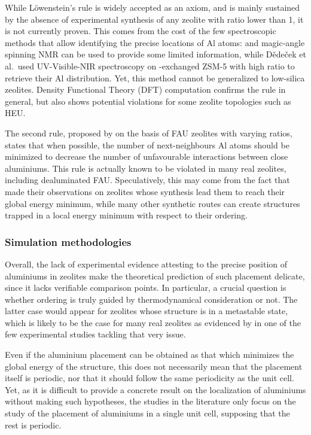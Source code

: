 \documentclass[main.tex]{subfiles}
\begin{document}
While L\"owenstein's rule is widely accepted as an axiom, and is mainly sustained by the absence of experimental synthesis of any zeolite with \SiAl ratio lower than 1, it is not currently proven. This comes from the cost of the few spectroscopic methods that allow identifying the precise locations of Al atoms:  and  magic-angle spinning NMR can be used to provide some limited information\autocite{ZeolitesMagicAngle}, while D{\v{e}}de{\v{c}}ek et al.\,\cite{ZeolitesAlPairs,ZeolitesAlPairs2} used UV-Visible-NIR spectroscopy on -exchanged ZSM-5 with high \SiAl ratio to retrieve their Al distribution. Yet, this method cannot be generalized to low-silica zeolites. Density Functional Theory (DFT) computation confirms the rule in general, but also shows potential violations for some zeolite topologies such as HEU\autocite{HEUnonLowenstein}.

The second rule, proposed by \textcite{Dempsey} on the basis of FAU zeolites with varying \SiAl ratios, states that when possible, the number of next-neighbours Al atoms should be minimized to decrease the number of unfavourable interactions between close aluminiums. This rule is actually known to be violated in many real zeolites, including dealuminated FAU. Speculatively, this may come from the fact that \textcite{Dempsey} made their observations on zeolites whose synthesis lead them to reach their global energy minimum, while many other synthetic routes can create structures trapped in a local energy minimum with respect to their \SiAl ordering.

\subsubsection{Simulation methodologies}

Overall, the lack of experimental evidence attesting to the precise position of aluminiums in zeolites make the theoretical prediction of such placement delicate, since it lacks verifiable comparison points. In particular, a crucial question is whether \SiAl ordering is truly guided by thermodynamical consideration or not\autocite{AlDistributionThermodynamic}. The latter case would appear for zeolites whose structure is in a metastable state, which is likely to be the case for many real zeolites as evidenced by \textcite{ZeolitesAlPairs2} in one of the few experimental studies tackling that very issue.

Even if the aluminium placement can be obtained as that which minimizes the global energy of the structure, this does not necessarily mean that the placement itself is periodic, nor that it should follow the same periodicity as the unit cell. Yet, as it is difficult to provide a concrete result on the localization of aluminiums without making such hypotheses, the studies in the literature only focus on the study of the placement of aluminiums in a single unit cell, supposing that the rest is periodic.
\end{document}
